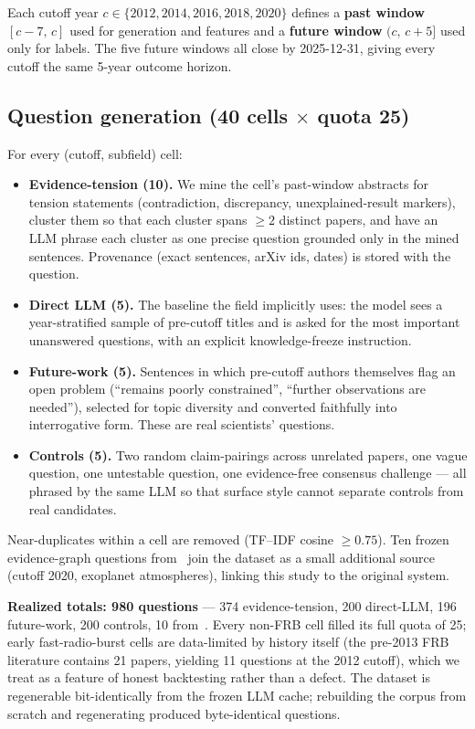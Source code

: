 \documentclass[11pt]{article}
\begin{document}
Each cutoff year $c \in \{2012, 2014, 2016, 2018, 2020\}$ defines a
\textbf{past window} $[c-7,\, c]$ used for generation and features and a
\textbf{future window} $(c,\, c+5]$ used only for labels. The five future
windows all close by 2025-12-31, giving every cutoff the same 5-year
outcome horizon.

\subsection{Question generation (40 cells $\times$ quota 25)}

For every (cutoff, subfield) cell:

\begin{itemize}
  \item \textbf{Evidence-tension (10).} We mine the cell's past-window
    abstracts for tension statements (contradiction, discrepancy,
    unexplained-result markers), cluster them so that each cluster spans
    $\geq 2$ distinct papers, and have an LLM phrase each cluster as one
    precise question grounded only in the mined sentences. Provenance
    (exact sentences, arXiv ids, dates) is stored with the question.
  \item \textbf{Direct LLM (5).} The baseline the field implicitly uses:
    the model sees a year-stratified sample of pre-cutoff titles and is
    asked for the most important unanswered questions, with an explicit
    knowledge-freeze instruction.
  \item \textbf{Future-work (5).} Sentences in which pre-cutoff authors
    themselves flag an open problem (``remains poorly constrained'',
    ``further observations are needed''), selected for topic diversity
    and converted faithfully into interrogative form. These are real
    scientists' questions.
  \item \textbf{Controls (5).} Two random claim-pairings across unrelated
    papers, one vague question, one untestable question, one
    evidence-free consensus challenge --- all phrased by the same LLM so
    that surface style cannot separate controls from real candidates.
\end{itemize}

Near-duplicates within a cell are removed (TF--IDF cosine $\geq 0.75$).
Ten frozen evidence-graph questions from~\cite{paper1} join the dataset as a
small additional source (cutoff 2020, exoplanet atmospheres), linking
this study to the original system.

\textbf{Realized totals: 980 questions} --- 374 evidence-tension, 200
direct-LLM, 196 future-work, 200 controls, 10 from~\cite{paper1}. Every non-FRB cell
filled its full quota of 25; early fast-radio-burst cells are
data-limited by history itself (the pre-2013 FRB literature contains 21
papers, yielding 11 questions at the 2012 cutoff), which we treat as a
feature of honest backtesting rather than a defect. The dataset is
regenerable bit-identically from the frozen LLM cache; rebuilding the
corpus from scratch and regenerating produced byte-identical questions.
\end{document}
